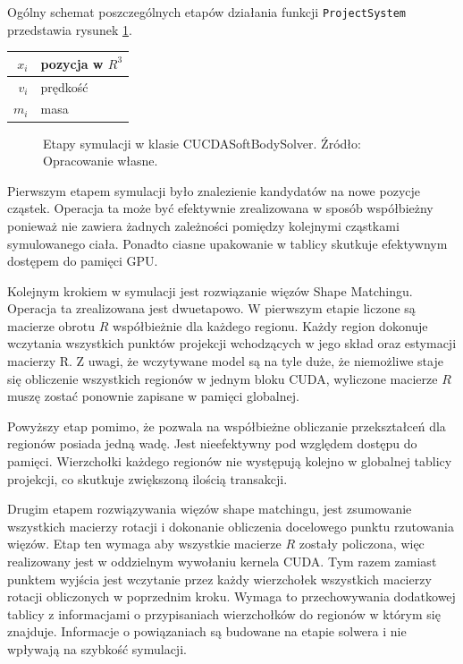 {Ogólny schemat poszczególnych etapów działania funkcji \texttt{ProjectSystem}
przedstawia rysunek \ref{flow-gpu}.

\centering
\begin{tabular}{|r|l|}
\hline
$x_i$ & pozycja w $R^3$ \\
\hline
$v_i$ & prędkość \\
\hline
$m_i$ & masa\\
\hline
\end{tabular}
\raggedright

\begin{figure}[H]
\centering

\caption{Etapy symulacji w klasie CUCDASoftBodySolver. Źródło: Opracowanie własne.}
\label{flow-gpu}
\end{figure}

Pierwszym etapem symulacji było znalezienie kandydatów na nowe pozycje cząstek.
Operacja ta może być efektywnie zrealizowana w sposób współbieżny ponieważ nie zawiera żadnych
zależności pomiędzy kolejnymi cząstkami symulowanego ciała. Ponadto ciasne
upakowanie w tablicy skutkuje efektywnym dostępem do pamięci GPU.

Kolejnym krokiem w symulacji jest rozwiązanie więzów Shape Matchingu. Operacja
ta zrealizowana jest dwuetapowo. W pierwszym etapie liczone są macierze obrotu
$R$ współbieżnie dla każdego regionu. Każdy region dokonuje wczytania wszystkich
punktów projekcji wchodzących w jego skład oraz estymacji macierzy R. Z uwagi,
że wczytywane model są na tyle duże, że niemożliwe staje się obliczenie
wszystkich regionów w jednym bloku CUDA, wyliczone macierze $R$ muszę zostać
ponownie zapisane w pamięci globalnej.

Powyższy etap pomimo, że pozwala na współbieżne obliczanie przekształceń dla
regionów posiada jedną wadę. Jest nieefektywny pod względem dostępu do pamięci.
Wierzchołki każdego regionów nie występują kolejno w globalnej tablicy
projekcji, co skutkuje zwiększoną ilością transakcji.

Drugim etapem rozwiązywania więzów shape matchingu, jest zsumowanie wszystkich
macierzy rotacji i dokonanie obliczenia docelowego punktu rzutowania więzów. Etap
ten wymaga aby wszystkie macierze $R$ zostały policzona, więc realizowany jest w
oddzielnym wywołaniu kernela CUDA. Tym razem zamiast punktem wyjścia jest
wczytanie przez każdy wierzchołek wszystkich macierzy rotacji obliczonych w
poprzednim kroku. Wymaga to przechowywania dodatkowej tablicy z informacjami o 
przypisaniach wierzchołków do regionów w którym się znajduje. Informacje o
powiązaniach są budowane na etapie solwera i nie wpływają na szybkość symulacji.

}
